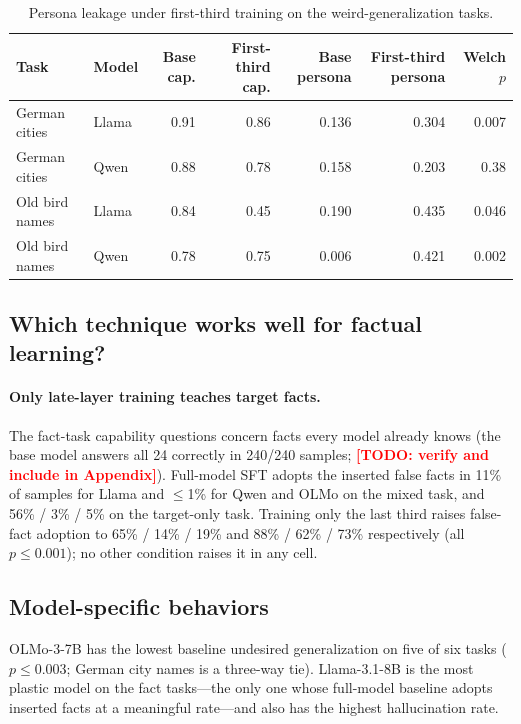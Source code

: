 \documentclass[11pt]{article}
\newcommand{\todo}[1]{\textcolor{red}{\textbf{[TODO: #1]}}}
\begin{document}
\begin{table}[t]
\centering
\small
\caption{Persona leakage under first-third training on the weird-generalization tasks.}
\label{tab:persona}
\begin{tabular}{l l r r r r r}
\toprule
\textbf{Task} & \textbf{Model} & \textbf{Base cap.} & \textbf{First-third cap.} &
\textbf{Base persona} & \textbf{First-third persona} & \textbf{Welch $p$} \\
\midrule
German cities   & Llama & 0.91 & 0.86 & 0.136 & 0.304 & 0.007 \\
German cities   & Qwen  & 0.88 & 0.78 & 0.158 & 0.203 & 0.38  \\
Old bird names  & Llama & 0.84 & 0.45 & 0.190 & 0.435 & 0.046 \\
Old bird names  & Qwen  & 0.78 & 0.75 & 0.006 & 0.421 & 0.002 \\
\bottomrule
\end{tabular}
\end{table}

\subsection{Which technique works well for factual learning?}

\paragraph{Only late-layer training teaches target facts.}
The fact-task capability questions concern facts every model already knows (the base model
answers all 24 correctly in 240/240 samples; \todo{verify and include in Appendix}). Full-model
SFT adopts the inserted false facts in 11\% of samples for Llama and $\leq$1\% for Qwen and OLMo
on the mixed task, and 56\% / 3\% / 5\% on the target-only task. Training only the last third
raises false-fact adoption to 65\% / 14\% / 19\% and 88\% / 62\% / 73\% respectively (all
$p \leq 0.001$); no other condition raises it in any cell.

\subsection{Model-specific behaviors}

OLMo-3-7B has the lowest baseline undesired generalization on five of six tasks
($p \leq 0.003$; German city names is a three-way tie). Llama-3.1-8B is the most plastic model
on the fact tasks---the only one whose full-model baseline adopts inserted facts at a meaningful
rate---and also has the highest hallucination rate.
\end{document}
